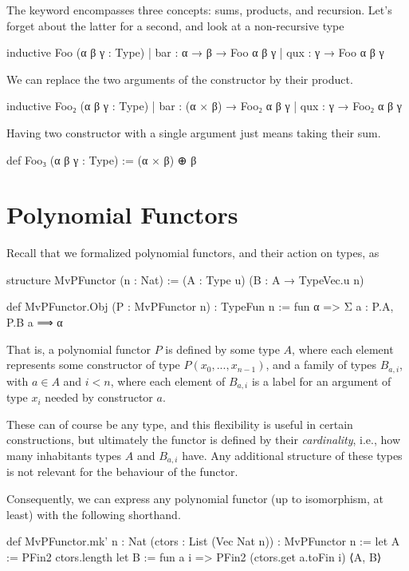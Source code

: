 \documentclass[titlepage]{report}
\begin{document}
The  keyword encompasses three concepts: sums, products, and recursion.
Let's forget about the latter for a second, and look at a non-recursive type
\begin{leancode}
    inductive Foo (α β γ : Type)
    | bar : α → β → Foo α β γ
    | qux : γ → Foo α β γ
\end{leancode}
We can replace the two arguments of the  constructor by their product.
\begin{leancode}
    inductive Foo₂ (α β γ : Type)
    | bar : (α × β) → Foo₂ α β γ
    | qux : γ → Foo₂ α β γ
\end{leancode}
Having two constructor with a single argument just means taking their sum.
\begin{leancode}
    def Foo₃ (α β γ : Type) :=
        (α × β) ⊕ β
\end{leancode}




\section{Polynomial Functors}

Recall that we formalized polynomial functors, and their action on types, as  
\begin{leancode}
    structure MvPFunctor (n : Nat) :=
        (A : Type u) (B : A → TypeVec.{u} n)

    def MvPFunctor.Obj (P : MvPFunctor n) : TypeFun n
        := fun α => Σ a : P.A, P.B a ⟹ α
\end{leancode}

That is, a polynomial functor $P$ is defined by some type $A$, where each element represents some 
constructor of type $P(x_0, ..., x_{n-1})$, and a family of types $B_{a, i}$, with $a ∈ A$ and $i < n$, 
where each element of $B_{a,i}$ is a label for an argument of type $x_i$ needed by constructor $a$.

These can of course be any type, and this flexibility is useful in certain constructions,
but ultimately the functor is defined by their \emph{cardinality}, i.e., how many inhabitants types 
$A$ and $B_{a,i}$ have. Any additional structure of these types is not relevant for the behaviour of 
the functor.

Consequently, we can express any polynomial functor (up to isomorphism, at least) with the following
shorthand.

\begin{leancode}
    def MvPFunctor.mk' {n : Nat} (ctors : List (Vec Nat n)) 
        : MvPFunctor n
    :=  let A := PFin2 ctors.length
        let B := fun a i => PFin2 (ctors.get a.toFin i)
        ⟨A, B⟩
\end{leancode}
\end{document}
